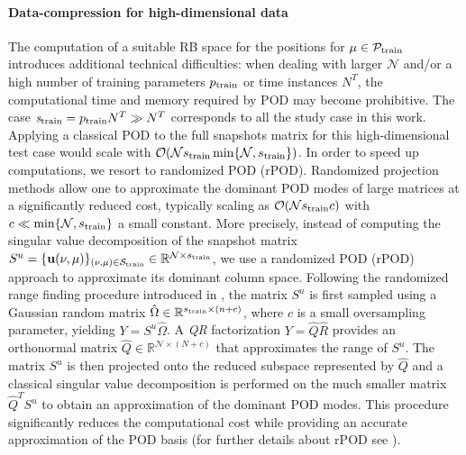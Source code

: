 \paragraph{Data-compression for high-dimensional data}
The computation of a suitable RB space for the positions for $\mu \in \mathcal{P}_{\rm{train}}$ introduces additional technical difficulties: when dealing with larger $\mathcal{N}$ and/or a high number of training parameters $p_{\rm{train}}$ or time instances $N^T$, the computational time and memory required by POD may become prohibitive. The case  $\textit{s}_{\rm{train}}=p_{\rm{train}}N^T  \gg N^T$ corresponds to all the study case in this work. Applying a classical POD to the full snapshots matrix for this high-dimensional test case would scale with $\mathcal{O}(\mathcal{N} s_{\rm{train}} \min\{\mathcal{N}, s_{\rm{train}}\})$. In order to speed up computations, we resort to randomized POD (rPOD). Randomized projection methods allow one to approximate the dominant POD modes of large matrices at a significantly reduced cost, typically scaling as $\mathcal{O}(\mathcal{N}s_{\rm{train}} c)$ with $c \ll \min\{\mathcal{N}, s_{\rm{train}}\}$ a small constant.
More precisely, instead of computing the singular value decomposition of the snapshot matrix $S^{u}=\{ \mathbf{u}(\nu,\mu) \}_{(\nu,\mu)\in \mathcal{S}_{\rm train}} \in \mathbb{R}^{\mathcal{N}\times s_{\rm train}}$, we use a randomized POD (rPOD) approach to approximate its dominant column space. Following the randomized range finding procedure introduced in \cite{Halko2011}, the matrix $S^{u}$ is first sampled using a Gaussian random matrix $\hat{\Omega} \in \mathbb{R}^{s_{\rm train}\times (n+c)}$, where $c$ is a small oversampling parameter, yielding $Y = S^{u}\hat{\Omega} $.
A \emph{QR} factorization $Y=\hat{Q}\hat{R}$ provides an orthonormal matrix $\hat{Q} \in \mathbb{R}^{\mathcal{N}\times (N+c)}$ that approximates the range of $S^{u}$. The matrix $S^{u}$ is then projected onto the reduced subspace represented by $\hat{Q}$ and a classical singular value decomposition is performed on the much smaller matrix $\hat{Q}^T S^{u}$ to obtain an approximation of the dominant POD modes. This procedure significantly reduces the computational cost while providing an accurate approximation of the POD basis (for further details about rPOD see \cite{Halko2011,Martinsson2020}).\\
